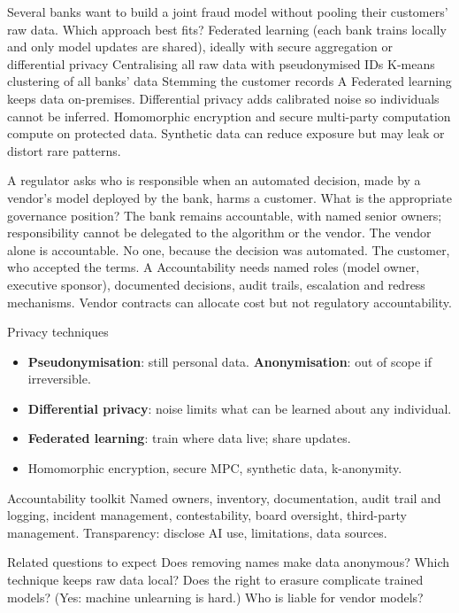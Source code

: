 {Several banks want to build a joint fraud model without pooling their customers' raw data. Which approach best fits?}
{Federated learning (each bank trains locally and only model updates are shared), ideally with secure aggregation or differential privacy}
{Centralising all raw data with pseudonymised IDs}
{K-means clustering of all banks' data}
{Stemming the customer records}
{A}
{Federated learning keeps data on-premises. Differential privacy adds calibrated noise so individuals cannot be inferred. Homomorphic encryption and secure multi-party computation compute on protected data. Synthetic data can reduce exposure but may leak or distort rare patterns.}

{A regulator asks who is responsible when an automated decision, made by a vendor's model deployed by the bank, harms a customer. What is the appropriate governance position?}
{The bank remains accountable, with named senior owners; responsibility cannot be delegated to the algorithm or the vendor.}
{The vendor alone is accountable.}
{No one, because the decision was automated.}
{The customer, who accepted the terms.}
{A}
{Accountability needs named roles (model owner, executive sponsor), documented decisions, audit trails, escalation and redress mechanisms. Vendor contracts can allocate cost but not regulatory accountability.}

{\begin{block}{Privacy techniques}
		\begin{itemize}
			\item \textbf{Pseudonymisation}: still personal data. \textbf{Anonymisation}: out of scope if irreversible.
			\item \textbf{Differential privacy}: noise limits what can be learned about any individual.
			\item \textbf{Federated learning}: train where data live; share updates.
			\item Homomorphic encryption, secure MPC, synthetic data, k-anonymity.
\end{itemize}\end{block}}
{\begin{block}{Accountability toolkit}
		Named owners, inventory, documentation, audit trail and logging, incident management, contestability, board oversight, third-party management. Transparency: disclose AI use, limitations, data sources.
	\end{block}
	\begin{alertblock}{Related questions to expect}
		Does removing names make data anonymous? Which technique keeps raw data local? Does the right to erasure complicate trained models? (Yes: machine unlearning is hard.) Who is liable for vendor models?
\end{alertblock}}